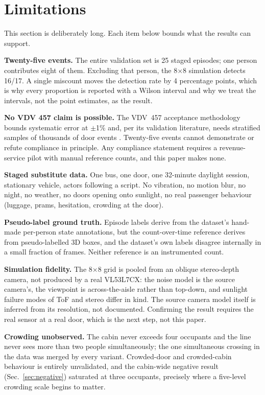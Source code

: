 \documentclass[conference]{IEEEtran}
\begin{document}
\section{Limitations}
\label{sec:limitations}

This section is deliberately long. Each item below bounds what the results can
support.

\textbf{Twenty-five events.} The entire validation set is 25 staged episodes;
one person contributes eight of them. Excluding that person, the 8$\times$8
simulation detects 16/17. A single miscount moves the detection rate by 4
percentage points, which is why every proportion is reported with a Wilson
interval and why we treat the intervals, not the point estimates, as the
result.

\textbf{No VDV 457 claim is possible.} The VDV~457 acceptance methodology
bounds systematic error at $\pm$1\% and, per its validation literature, needs
stratified samples of thousands of door events \cite{vdv457,ellenberger2023}.
Twenty-five events cannot demonstrate or refute compliance in principle. Any
compliance statement requires a revenue-service pilot with manual reference
counts, and this paper makes none.

\textbf{Staged substitute data.} One bus, one door, one 32-minute daylight
session, stationary vehicle, actors following a script. No vibration, no
motion blur, no night, no weather, no doors opening onto sunlight, no real
passenger behaviour (luggage, prams, hesitation, crowding at the door).

\textbf{Pseudo-label ground truth.} Episode labels derive from the dataset's
hand-made per-person state annotations, but the count-over-time reference
derives from pseudo-labelled 3D boxes, and the dataset's own labels disagree
internally in a small fraction of frames. Neither reference is an instrumented
count.

\textbf{Simulation fidelity.} The 8$\times$8 grid is pooled from an oblique
stereo-depth camera, not produced by a real VL53L7CX: the noise model is the
source camera's, the viewpoint is across-the-aisle rather than top-down, and
sunlight failure modes of ToF and stereo differ in kind. The source camera
model itself is inferred from its resolution, not documented. Confirming the
result requires the real sensor at a real door, which is the next step, not
this paper.

\textbf{Crowding unobserved.} The cabin never exceeds four occupants and the
line never sees more than two people simultaneously; the one simultaneous
crossing in the data was merged by every variant. Crowded-door and
crowded-cabin behaviour is entirely unvalidated, and the cabin-wide negative
result (Sec.~\ref{sec:negative}) saturated at three occupants, precisely
where a five-level crowding scale begins to matter.
\end{document}
